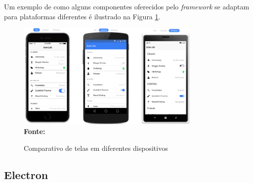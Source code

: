 
Um exemplo de como alguns componentes oferecidos pelo \textit{framework} se adaptam para plataformas diferentes é ilustrado na Figura \ref{fig:figura1}.

\begin{figure}[ht]
	\centering	
	\caption[\hspace{0.1cm}Comparativo de telas em diferentes dispositivos.]{Comparativo de telas em diferentes dispositivos}
	\vspace{-0.4cm}
	\includegraphics[width=0.8\textwidth]{figuras/ComparativodeTelasIonic.png}
	\vspace{-0.2cm}
	\\\textbf{\footnotesize Fonte: \cite{ionicDocs} }
	\label{fig:figura1}
\end{figure}
\vspace{-0.5cm}


\subsection{\esp Electron}

